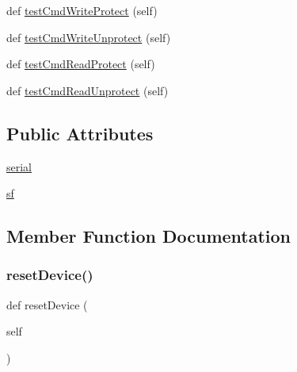 \begin{DoxyCompactItemize}
\item 
def \hyperlink{classstm__tools_1_1tests_1_1serialflasher__test_1_1SerialFlasherTestCase_aeadcb812deb6d74af00e557b59bb3906}{test\+Cmd\+Write\+Protect} (self)
\item 
def \hyperlink{classstm__tools_1_1tests_1_1serialflasher__test_1_1SerialFlasherTestCase_ac137024da2dc3ada51d8cb8bc1d4eca9}{test\+Cmd\+Write\+Unprotect} (self)
\item 
def \hyperlink{classstm__tools_1_1tests_1_1serialflasher__test_1_1SerialFlasherTestCase_a643113c69f00e161c618ba8a8e0c894a}{test\+Cmd\+Read\+Protect} (self)
\item 
def \hyperlink{classstm__tools_1_1tests_1_1serialflasher__test_1_1SerialFlasherTestCase_a3b8dd28cc2525171c4cd37e5d212a005}{test\+Cmd\+Read\+Unprotect} (self)
\end{DoxyCompactItemize}
\subsection*{Public Attributes}
\begin{DoxyCompactItemize}
\item 
\hyperlink{classstm__tools_1_1tests_1_1serialflasher__test_1_1SerialFlasherTestCase_afae8c8266de12daf134ef2bf3a869f65}{serial}
\item 
\hyperlink{classstm__tools_1_1tests_1_1serialflasher__test_1_1SerialFlasherTestCase_ad713e38281718ed2d493fdcfa44dac7e}{sf}
\end{DoxyCompactItemize}


\subsection{Member Function Documentation}
\mbox{\label{classstm__tools_1_1tests_1_1serialflasher__test_1_1SerialFlasherTestCase_a3c64ad4ffc70313fb320cbff348ca340}} 
\subsubsection{\texorpdfstring{reset\+Device()}{resetDevice()}}
{\footnotesize\ttfamily def reset\+Device (\begin{DoxyParamCaption}\item[{}]{self }\end{DoxyParamCaption})}

